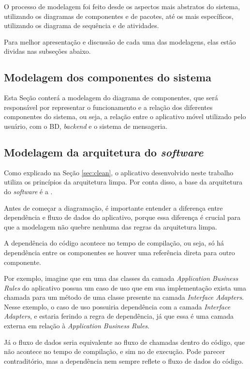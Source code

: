 O processo de modelagem foi feito desde os aspectos mais abstratos do sistema, utilizando os diagramas de componentes e de pacotes, até os mais específicos, utilizando os diagrama de sequência e de atividades.

Para melhor apresentação e discussão de cada uma das modelagens, elas estão dividas nas subseções abaixo.

\subsection{Modelagem dos componentes do sistema}
Esta Seção conterá a modelagem do diagrama de componentes, que será responsável por representar o funcionamento e a relação dos diferentes componentes do sistema, ou seja, a relação entre o aplicativo móvel utilizado pelo usuário, com o BD, \textit{backend} e o sistema de mensageria.

\subsection{Modelagem da arquitetura do \textit{software}}
Como explicado na Seção \ref{sec:clean}, o aplicativo desenvolvido neste trabalho utiliza os princípios da arquitetura limpa. Por conta disso, a base da arquitetura do \textit{software} é a .

Antes de começar a diagramação, é importante entender a diferença entre dependência e fluxo de dados do aplicativo, porque essa diferença é crucial para que a modelagem não quebre nenhuma das regras da arquitetura limpa.

A dependência do código acontece no tempo de compilação, ou seja, só há dependência entre os componentes se houver uma referência direta para outro componente.

Por exemplo, imagine que em uma das classes da camada \textit{Application Business Rules} do aplicativo possua um caso de uso que em sua implementação exista uma chamada para um método de uma classe presente na camada \textit{Interface Adapters}. Nesse exemplo, o caso de uso possuiria dependência com a camada \textit{Interface Adapters}, e estaria ferindo a regra de dependência, já que essa é uma camada externa em relação à \textit{Application Business Rules}.

Já o fluxo de dados seria equivalente ao fluxo de chamadas dentro do código, que não acontece no tempo de compilação, e sim no de execução. Pode parecer contraditório, mas a dependência nem sempre reflete o fluxo de dados do código.

